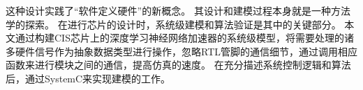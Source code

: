 这种设计实践了“软件定义硬件”的新概念。
其设计和建模过程本身就是一种方法学的探索。
在进行芯片的设计时，系统级建模和算法验证是其中的关键部分。
本文通过构建CIS芯片上的深度学习神经网络加速器的系统级模型，将需要处理的诸多硬件信号作为抽象数据类型进行操作，忽略RTL管脚的通信细节，通过调用相应函数来进行模块之间的通信，提高仿真的速度。
在充分描述系统控制逻辑和算法后，通过SystemC来实现建模的工作。
